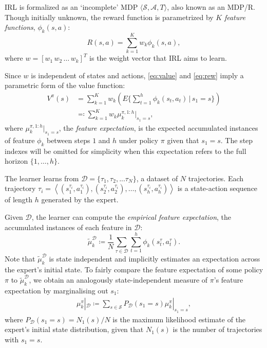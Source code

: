 \documentclass[letterpaper]{article}
\begin{document}
IRL is formalized as an `incomplete' MDP $\langle\mathcal{S},\mathcal{A},T\rangle$, also known as an MDP/R. Though initially unknown, the reward function is parametrized by $K$ \emph{feature functions}, $\phi_k(s,a)$:
\begin{equation}
R(s,a) = \sum_{k=1}^Kw_k\phi_k(s,a), \label{eq:rew}
\end{equation}
where $w=[w_1\,w_2\,\ldots\,w_k]^T$ is the weight vector that IRL aims to learn.

Since $w$ is independent of states and actions, \eqref{eq:value} and \eqref{eq:rew} imply a parametric form of the value function:
\begin{align}
 	V^{\pi}(s) &= \sum^K_{k=1}w_k\left(E\{\sum_{t = 1}^h\phi_k(s_t,a_t)\,\vert\, s_1 = s\}\right)\\
&\eqqcolon\sum^K_{k=1}w_k\mu^{\pi, 1:h}_k|_{s_1=s},\label{eq:parametrized_value}
\end{align}
where $\mu^{\pi,1:h}_k|_{s_1=s}$, the \emph{feature expectation}, is the expected accumulated instances of feature $\phi_k$ between steps $1$ and $h$ under policy $\pi$  given that $s_1 = s$. The step indexes will be omitted for simplicity when this expectation refers to the full horizon $\{1,\ldots,h\}$.

The learner learns from $\mathcal{D} = \big\{ \tau_1,\tau_2,...\tau_N \big\}$, a dataset of $N$ trajectories. Each trajectory $\tau_i = \left<(s^{\tau_i}_1,a^{\tau_i}_1),(s^{\tau_i}_2,a^{\tau_i}_2),\ldots,(s^{\tau_i}_{h},a^{\tau_i}_{h})\right>$ is a state-action sequence of length $h$ generated by the expert.

Given $\mathcal{D}$, the learner can compute the \emph{empirical feature expectation}, the accumulated instances of each feature in $\mathcal{D}$:
\begin{equation}
	\widetilde{\mu}^{\mathcal{D}}_k \coloneqq\frac{1}{N}\sum_{\tau\in\mathcal{D}}\sum_{t=1}^{h}\phi_k(s^\tau_t,a^\tau_t). \label{eqn:empirical_fe}
\end{equation}
Note that $\widetilde{\mu}^{\mathcal{D}}_k$ is state independent and implicitly estimates an expectation across
the expert's initial state.  To fairly compare the feature expectation of some policy $\pi$ to $\widetilde{\mu}^{\mathcal{D}}_k$, we obtain an analogously state-independent measure of $\pi$'s feature expectation by marginalising out $s_1$:
\begin{align}
  \label{eq:feature_expectation_belief}
  \mu^{\pi}_k|_{\mathcal{D}} \coloneqq \sum_{s\in\mathcal{S}}P_{\mathcal{D}}(s_1 = s)\mu^{\pi}_k|_{s_1=s},
\end{align}
where $P_{\mathcal{D}}(s_1 = s)= N_1(s)/N$ is the maximum likelihood estimate of the expert's initial state distribution, given that $N_1(s)$ is the number of trajectories with $s_1 = s$.
\end{document}
